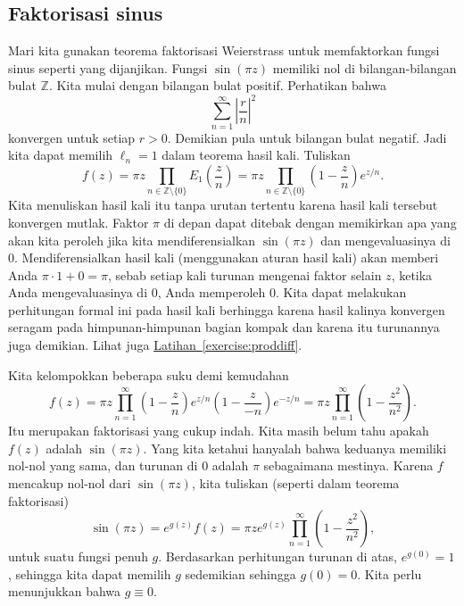 \documentclass[12pt,openany]{book}
\newcommand{\abs}[1]{\left\lvert {#1} \right\rvert}
\newcommand{\Z}{{\mathbb{Z}}}
\theoremstyle{plain}
\theoremstyle{remark}
\theoremstyle{definition}
\theoremstyle{exercise}
\theoremstyle{example}
\newcommand{\exerciseref}[1]{\hyperref[#1]{Latihan~\ref*{#1}}}
\begin{document}
\subsection{Faktorisasi sinus}

Mari kita gunakan teorema faktorisasi Weierstrass untuk memfaktorkan fungsi sinus
seperti yang dijanjikan.  Fungsi $\sin(\pi z)$ memiliki nol di bilangan-bilangan bulat $\Z$.
Kita mulai dengan bilangan bulat positif.  Perhatikan bahwa
\begin{equation*}
\sum_{n=1}^\infty \abs{\frac{r}{n}}^{2}
\end{equation*}
konvergen untuk setiap $r > 0$.  Demikian pula untuk bilangan bulat negatif.  Jadi kita
dapat memilih $\ell_n =1$ dalam teorema hasil kali.  Tuliskan
\begin{equation*}
f(z) =
\pi z \prod_{n \in \Z \setminus \{ 0 \}} E_1\left(\frac{z}{n}\right)
= 
\pi z \prod_{n \in \Z \setminus \{ 0 \}} \left(1-\frac{z}{n}\right) e^{z/n} .
\end{equation*}
Kita menuliskan hasil kali itu tanpa urutan tertentu karena hasil kali tersebut konvergen
mutlak.
Faktor $\pi$ di depan dapat ditebak dengan memikirkan apa yang akan kita peroleh jika kita
mendiferensialkan $\sin(\pi z)$ dan mengevaluasinya di $0$.
Mendiferensialkan hasil kali (menggunakan aturan hasil kali) akan memberi Anda $\pi \cdot 1
+ 0=\pi$, sebab setiap kali turunan mengenai faktor selain $z$, ketika
Anda mengevaluasinya di $0$, Anda memperoleh $0$.  Kita dapat melakukan perhitungan formal ini pada
hasil kali berhingga karena hasil kalinya konvergen seragam pada himpunan-himpunan bagian kompak dan
karena itu turunannya juga demikian.  Lihat juga \exerciseref{exercise:proddiff}.

Kita kelompokkan beberapa suku demi kemudahan
\begin{equation*}
f(z) =
\pi z \prod_{n=1}^\infty 
\left(1-\frac{z}{n}\right) e^{z/n}
\left(1-\frac{z}{-n}\right) e^{-z/n}
=
\pi z \prod_{n=1}^\infty 
\left(1-\frac{z^2}{n^2}\right) .
\end{equation*}
Itu merupakan faktorisasi yang cukup indah.  Kita masih belum tahu apakah $f(z)$ adalah
$\sin(\pi z)$.
Yang kita ketahui hanyalah bahwa keduanya memiliki nol-nol yang sama,
dan turunan di $0$ adalah $\pi$ sebagaimana mestinya.
Karena $f$ mencakup nol-nol dari $\sin(\pi z)$, kita tuliskan
(seperti dalam teorema faktorisasi)
\begin{equation*}
\sin(\pi z)
= 
e^{g(z)} f(z)
=
\pi z
e^{g(z)}
\prod_{n=1}^\infty 
\left(1-\frac{z^2}{n^2}\right) ,
\end{equation*}
untuk suatu fungsi penuh $g$.
Berdasarkan
perhitungan turunan di atas,
$e^{g(0)}=1$, sehingga kita dapat memilih $g$ sedemikian sehingga $g(0) = 0$.
Kita perlu menunjukkan bahwa $g \equiv 0$.
\end{document}
